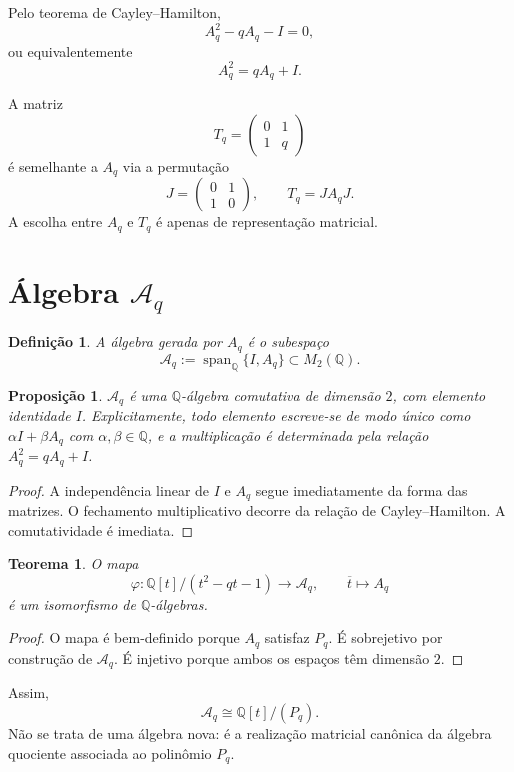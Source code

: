\documentclass[11pt,a4paper]{article}
\newtheorem{definicao}{Definição}
\newtheorem{teorema}{Teorema}
\newtheorem{proposicao}{Proposição}
\begin{document}
Pelo teorema de Cayley--Hamilton,
\[
A_q^2-qA_q-I=0,
\]
ou equivalentemente
\[
\boxed{A_q^2=qA_q+I.}
\]

A matriz
\[
T_q=\begin{pmatrix}0&1\\1&q\end{pmatrix}
\]
é semelhante a \(A_q\) via a permutação
\[
J=\begin{pmatrix}0&1\\1&0\end{pmatrix},
\qquad
T_q=JA_qJ.
\]
A escolha entre \(A_q\) e \(T_q\) é apenas de representação matricial.

\section{Álgebra \(\mathcal{A}_q\)}

\begin{definicao}
A álgebra gerada por \(A_q\) é o subespaço
\[
\mathcal{A}_q:=\operatorname{span}_{\mathbb{Q}}\{I,A_q\}\subset M_2(\mathbb{Q}).
\]
\end{definicao}

\begin{proposicao}
\(\mathcal{A}_q\) é uma \(\mathbb{Q}\)-álgebra comutativa de dimensão \(2\),
com elemento identidade \(I\). Explicitamente, todo elemento escreve-se de
modo único como \(\alpha I+\beta A_q\) com \(\alpha,\beta\in\mathbb{Q}\), e
a multiplicação é determinada pela relação \(A_q^2=qA_q+I\).
\end{proposicao}

\begin{proof}
A independência linear de \(I\) e \(A_q\) segue imediatamente da forma das
matrizes. O fechamento multiplicativo decorre da relação de Cayley--Hamilton.
A comutatividade é imediata.
\end{proof}

\begin{teorema}
O mapa
\[
\varphi:\mathbb{Q}[t]/(t^2-qt-1)\longrightarrow\mathcal{A}_q,
\qquad
\overline{t}\longmapsto A_q
\]
é um isomorfismo de \(\mathbb{Q}\)-álgebras.
\end{teorema}

\begin{proof}
O mapa é bem-definido porque \(A_q\) satisfaz \(P_q\). É sobrejetivo por
construção de \(\mathcal{A}_q\). É injetivo porque ambos os espaços têm
dimensão \(2\).
\end{proof}

Assim,
\[
\boxed{\mathcal{A}_q\cong\mathbb{Q}[t]/(P_q)}.
\]
Não se trata de uma álgebra nova: é a realização matricial canônica da
álgebra quociente associada ao polinômio \(P_q\).
\end{document}
